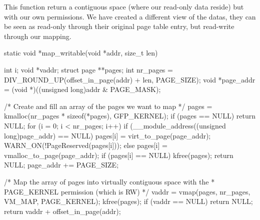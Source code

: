 This function return a contiguous space (where our read-only data reside) but
with our own permissions. We have created a different view of the datas, they
can be seen as read-only through their original page table entry, but
read-write through our mapping.

\begin{ccode}
static void *map_writable(void *addr, size_t len) {
    int i;
    void *vaddr;
    struct page **pages;
    int nr_pages = DIV_ROUND_UP(offset_in_page(addr) + len, PAGE_SIZE);
    void *page_addr = (void *)((unsigned long)addr & PAGE_MASK);

    /* Create and fill an array of the pages we want to map */
    pages = kmalloc(nr_pages * sizeof(*pages), GFP_KERNEL);
    if (pages == NULL)
        return NULL;
    for (i = 0; i < nr_pages; i++) {
        if (__module_address((unsigned long)page_addr) == NULL) {
            pages[i] = virt_to_page(page_addr);
            WARN_ON(!PageReserved(pages[i]));
        } else {
            pages[i] = vmalloc_to_page(page_addr);
        }
        if (pages[i] == NULL) {
            kfree(pages);
            return NULL;
        }
        page_addr += PAGE_SIZE;
    }

    /* Map the array of pages into virtually contiguous space with the 
     * PAGE_KERNEL permission (which is RW)
     */
    vaddr = vmap(pages, nr_pages, VM_MAP, PAGE_KERNEL);
    kfree(pages);
    if (vaddr == NULL)
        return NULL;
    return vaddr + offset_in_page(addr);
}
\end{ccode}

\cite{write_protected}
